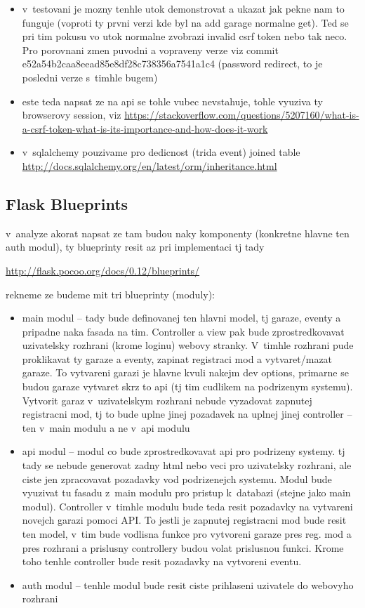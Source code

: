 \begin{itemize}
\item v~testovani je mozny tenhle utok demonstrovat a ukazat jak pekne nam to funguje (voproti ty prvni verzi kde byl na add garage normalne get). Ted se pri tim pokusu vo utok normalne zvobrazi invalid csrf token nebo tak neco. Pro porovnani zmen puvodni a vopraveny verze viz commit e52a54b2caa8eead85e8df28c738356a7541a1c4 (password redirect, to je posledni verze s~timhle bugem)

\item este teda napsat ze na api se tohle vubec nevstahuje, tohle vyuziva ty browserovy session, viz \url{https://stackoverflow.com/questions/5207160/what-is-a-csrf-token-what-is-its-importance-and-how-does-it-work}

\item v~sqlalchemy pouzivame pro dedicnost (trida event) joined table \url{http://docs.sqlalchemy.org/en/latest/orm/inheritance.html}

\end{itemize}

\subsection{Flask Blueprints}

v~analyze akorat napsat ze tam budou naky komponenty (konkretne hlavne ten auth modul), ty blueprinty resit az pri implementaci tj tady

\url{http://flask.pocoo.org/docs/0.12/blueprints/}

rekneme ze budeme mit tri blueprinty (moduly):

\begin{itemize}
    \item main modul -- tady bude definovanej ten hlavni model, tj garaze, eventy a pripadne naka fasada na tim. Controller a view pak bude zprostredkovavat uzivatelsky rozhrani (krome loginu) webovy stranky. V~timhle rozhrani pude proklikavat ty garaze a eventy, zapinat registraci mod a vytvaret/mazat garaze. To vytvareni garazi je hlavne kvuli nakejm dev options, primarne se budou garaze vytvaret skrz to api (tj tim cudlikem na podrizenym systemu). Vytvorit garaz v~uzivatelskym rozhrani nebude vyzadovat zapnutej registracni mod, tj to bude uplne jinej pozadavek na uplnej jinej controller -- ten v~main modulu a ne v~api modulu
    \item api modul -- modul co bude zprostredkovavat api pro podrizeny systemy. tj tady se nebude generovat zadny html nebo veci pro uzivatelsky rozhrani, ale ciste jen zpracovavat pozadavky vod podrizenejch systemu. Modul bude vyuzivat tu fasadu z~main modulu pro pristup k~databazi (stejne jako main modul). Controller v~timhle modulu bude teda resit pozadavky na vytvareni novejch garazi pomoci API. To jestli je zapnutej registracni mod bude resit ten model, v~tim bude vodlisna funkce pro vytvoreni garaze pres reg. mod a pres rozhrani a prislusny controllery budou volat prislusnou funkci. Krome toho tenhle controller bude resit pozadavky na vytvoreni eventu.
    \item auth modul -- tenhle modul bude resit ciste prihlaseni uzivatele do webovyho rozhrani
\end{itemize}

